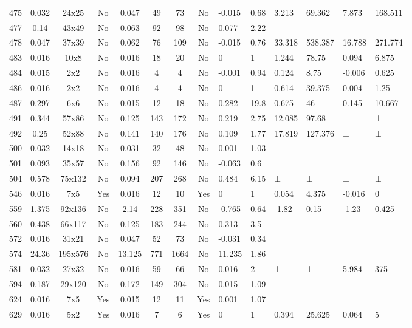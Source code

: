 \documentclass[11pt]{article}
\begin{document}
\begin{landscape}
\begin{small}
\begin{longtable}[c]{| c | c | c | c |c |c |c |c |p{1.5cm} |p{1.5cm} |p{1.5cm} |p{1.5cm} |p{1.5cm} |p{1.5cm} |}
475 & 0.032 & 24x25 & No & 0.047 & 49 & 73 & No & -0.015 & 0.68 & 3.213 & 69.362 & 7.873 & 168.511\\
477 & 0.14 & 43x49 & No & 0.063 & 92 & 98 & No & 0.077 & 2.22 &  &  &  & \\
478 & 0.047 & 37x39 & No & 0.062 & 76 & 109 & No & -0.015 & 0.76 & 33.318 & 538.387 & 16.788 & 271.774\\
483 & 0.016 & 10x8 & No & 0.016 & 18 & 20 & No & 0 & 1 & 1.244 & 78.75 & 0.094 & 6.875\\
484 & 0.015 & 2x2 & No & 0.016 & 4 & 4 & No & -0.001 & 0.94 & 0.124 & 8.75 & -0.006 & 0.625\\
486 & 0.016 & 2x2 & No & 0.016 & 4 & 4 & No & 0 & 1 & 0.614 & 39.375 & 0.004 & 1.25\\
487 & 0.297 & 6x6 & No & 0.015 & 12 & 18 & No & 0.282 & 19.8 & 0.675 & 46 & 0.145 & 10.667\\
491 & 0.344 & 57x86 & No & 0.125 & 143 & 172 & No & 0.219 & 2.75 & 12.085 & 97.68 & $\bot$ & $\bot$\\
492 & 0.25 & 52x88 & No & 0.141 & 140 & 176 & No & 0.109 & 1.77 & 17.819 & 127.376 & $\bot$ & $\bot$\\
500 & 0.032 & 14x18 & No & 0.031 & 32 & 48 & No & 0.001 & 1.03 &  &  &  & \\
501 & 0.093 & 35x57 & No & 0.156 & 92 & 146 & No & -0.063 & 0.6 &  &  &  & \\
504 & 0.578 & 75x132 & No & 0.094 & 207 & 268 & No & 0.484 & 6.15 & $\bot$ & $\bot$ & $\bot$ & $\bot$\\
546 & 0.016 & 7x5 & Yes & 0.016 & 12 & 10 & Yes & 0 & 1 & 0.054 & 4.375 & -0.016 & 0\\
559 & 1.375 & 92x136 & No & 2.14 & 228 & 351 & No & -0.765 & 0.64 & -1.82 & 0.15 & -1.23 & 0.425\\
560 & 0.438 & 66x117 & No & 0.125 & 183 & 244 & No & 0.313 & 3.5 &  &  &  & \\
572 & 0.016 & 31x21 & No & 0.047 & 52 & 73 & No & -0.031 & 0.34 &  &  &  & \\
574 & 24.36 & 195x576 & No & 13.125 & 771 & 1664 & No & 11.235 & 1.86 &  &  &  & \\
581 & 0.032 & 27x32 & No & 0.016 & 59 & 66 & No & 0.016 & 2 & $\bot$ & $\bot$ & 5.984 & 375\\
594 & 0.187 & 29x120 & No & 0.172 & 149 & 304 & No & 0.015 & 1.09 &  &  &  & \\
624 & 0.016 & 7x5 & Yes & 0.015 & 12 & 11 & Yes & 0.001 & 1.07 &  &  &  & \\
629 & 0.016 & 5x2 & Yes & 0.016 & 7 & 6 & Yes & 0 & 1 & 0.394 & 25.625 & 0.064 & 5\\

\end{longtable}
\end{small}
\end{landscape}
\end{document}
